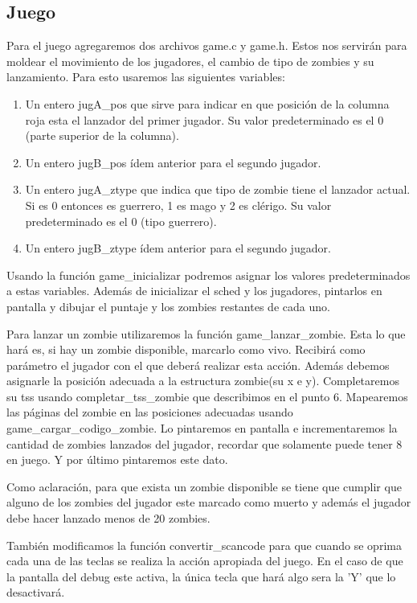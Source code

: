 \documentclass[a4paper]{article}
\begin{document}
\subsection{Juego}

Para el juego agregaremos dos archivos game.c y game.h. Estos nos servirán para moldear el movimiento de los jugadores, el cambio de tipo de zombies y su lanzamiento. Para esto usaremos las siguientes variables:

\begin{enumerate}
  \item Un entero jugA\_pos que sirve para indicar en que posición de la columna roja esta el lanzador del primer jugador. Su valor predeterminado es el 0 (parte superior de la columna).
  \item Un entero jugB\_pos ídem anterior para el segundo jugador.
  \item Un entero jugA\_ztype que indica que tipo de zombie tiene el lanzador actual. Si es 0 entonces es guerrero, 1 es mago y 2 es clérigo. Su valor predeterminado es el 0 (tipo guerrero).
  \item Un entero jugB\_ztype ídem anterior para el segundo jugador.
\end{enumerate}

Usando la función game\_inicializar podremos asignar los valores predeterminados a estas variables. Además de inicializar el sched y los jugadores, pintarlos en pantalla y dibujar el puntaje y los zombies restantes de cada uno.

Para lanzar un zombie utilizaremos la función game\_lanzar\_zombie. Esta lo que hará es, si hay un zombie disponible, marcarlo como vivo. Recibirá como parámetro el jugador con el que deberá realizar esta acción. Además debemos asignarle la posición adecuada a la estructura zombie(su x e y). Completaremos su tss usando completar\_tss\_zombie que describimos en el punto 6. Mapearemos las páginas del zombie en las posiciones adecuadas usando game\_cargar\_codigo\_zombie. Lo pintaremos en pantalla e incrementaremos la cantidad de zombies lanzados del jugador, recordar que solamente puede tener 8 en juego. Y por último pintaremos este dato. 

Como aclaración, para que exista un zombie disponible se tiene que cumplir que alguno de los zombies del jugador este marcado como muerto y además el jugador debe hacer lanzado menos de 20 zombies. 

También modificamos la función convertir\_scancode para que cuando se oprima cada una de las teclas se realiza la acción apropiada del juego. En el caso de que la pantalla del debug este activa, la única tecla que hará algo sera la 'Y' que lo desactivará.
\end{document}
